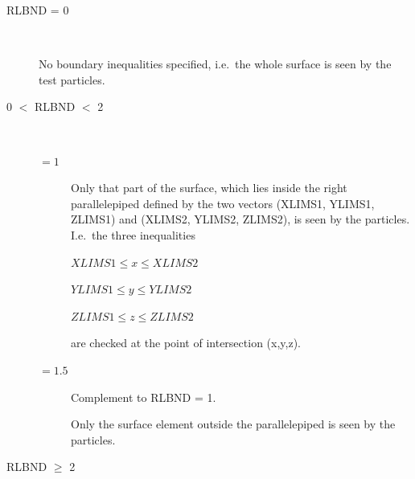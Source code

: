 \begin{description}
  \item[RLBND = 0] ~ 

        No boundary inequalities specified, i.e.\ the whole surface is seen by the test
        particles.
  \item[0  $<$	 RLBND	$<$   2] ~ 

        \begin{description}
          \item[$= 1$] Only that part of the surface, which lies
                inside the right parallelepiped defined by the two vectors (XLIMS1, YLIMS1,
                ZLIMS1) and (XLIMS2, YLIMS2, ZLIMS2), is seen by the particles.
                I.e.\ the three inequalities 

                $XLIMS1 \le x \le XLIMS2$ 

                $YLIMS1 \le y \le YLIMS2$ 

                $ZLIMS1 \le z \le ZLIMS2$ 

                are checked at the point of intersection (x,y,z).
          \item[$= 1.5$] Complement to RLBND = 1.

                Only the surface element outside the parallelepiped is seen by the particles.
        \end{description}
  \item[RLBND $\ge$ 2] ~ 


\end{description}
